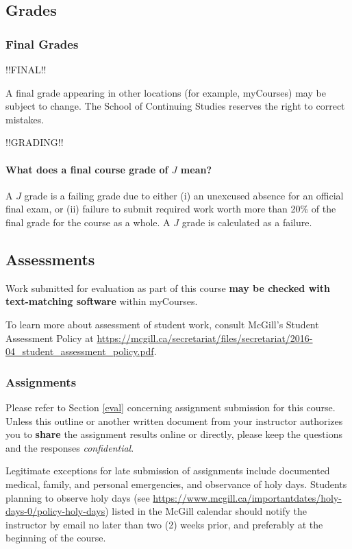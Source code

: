 \documentclass{article}
\begin{document}
\subsection{Grades}

\subsubsection{Final Grades}

!!FINAL!!

A final grade appearing in other locations (for example, myCourses)
may be subject to change.  The School of Continuing Studies reserves
the right to correct mistakes.

!!GRADING!!

\paragraph{What does a final course grade of $J$ mean?}

A $J$ grade is a failing grade due to either (i) an unexcused absence
for an official final exam, or (ii) failure to submit required work
worth more than 20\% of the final grade for the course as a whole. A
$J$ grade is calculated as a failure.

\newpage

\subsection{Assessments}

Work submitted for evaluation as part of this course {\bf may be
  checked with text-matching software} within myCourses.

To learn more about assessment of student work, consult McGill's
Student Assessment Policy at
\url{https://mcgill.ca/secretariat/files/secretariat/2016-04_student_assessment_policy.pdf}.


\subsubsection{Assignments}

Please refer to Section \ref{eval} concerning assignment submission
for this course. Unless this outline or another written document from
your instructor authorizes you to {\bf share} the assignment results
online or directly, please keep the questions and the responses {\em
  confidential}.

Legitimate exceptions for late submission of assignments include
documented medical, family, and personal emergencies, and observance
of holy days. Students planning to observe holy days (see
\url{https://www.mcgill.ca/importantdates/holy-days-0/policy-holy-days})
listed in the McGill calendar should notify the instructor by email no
later than two (2) weeks prior, and preferably at the beginning of the
course.
\end{document}
